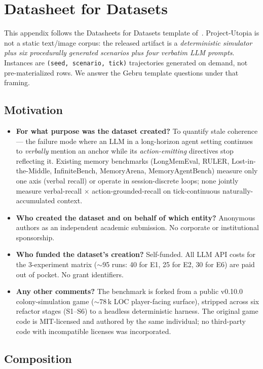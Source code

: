 \section{Datasheet for Datasets}
\label{app:datasheet}

This appendix follows the Datasheets for Datasets template
of~\citet{Gebru2018Datasheets}. Project-Utopia is not a static
text/image corpus: the released artifact is a \emph{deterministic
simulator plus six procedurally generated scenarios plus four
verbatim LLM prompts}. Instances are \texttt{(seed, scenario, tick)}
trajectories generated on demand, not pre-materialized rows. We
answer the Gebru template questions under that framing.

\subsection{Motivation}

\begin{itemize}[leftmargin=*]
\item \textbf{For what purpose was the dataset created?}
To quantify stale coherence --- the failure mode where an LLM in a
long-horizon agent setting continues to \emph{verbally} mention an
anchor while its \emph{action-emitting} directives stop reflecting
it. Existing memory benchmarks (LongMemEval, RULER,
Lost-in-the-Middle, InfiniteBench, MemoryArena, MemoryAgentBench)
measure only one axis (verbal recall) or operate in session-discrete
loops; none jointly measure verbal-recall $\times$
action-grounded-recall on tick-continuous naturally-accumulated
context.
\item \textbf{Who created the dataset and on behalf of which
entity?}
Anonymous authors as an independent academic submission. No
corporate or institutional sponsorship.
\item \textbf{Who funded the dataset's creation?}
Self-funded. All LLM API costs for the 3-experiment matrix
($\sim$95 runs: 40 for E1, 25 for E2, 30 for E6) are paid out of
pocket. No grant identifiers.
\item \textbf{Any other comments?}
The benchmark is forked from a public v0.10.0 colony-simulation
game ($\sim$78\,k LOC player-facing surface), stripped across six
refactor stages (S1--S6) to a headless deterministic harness. The
original game code is MIT-licensed and authored by the same
individual; no third-party code with incompatible licenses was
incorporated.
\end{itemize}

\subsection{Composition}


